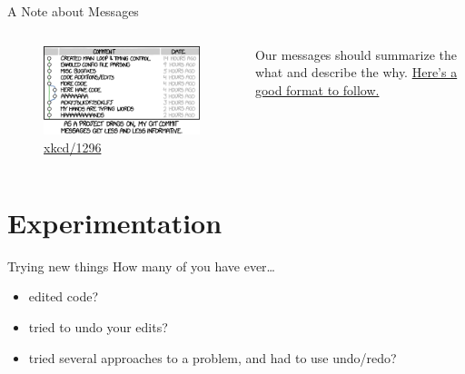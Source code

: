 \documentclass{beamer}
\theoremstyle{example}
\newcommand{\xkcd}[1]{\href{https://xkcd.com/#1}{xkcd/#1}}
\begin{document}
\begin{frame}{A Note about Messages}
    \begin{columns}
        \begin{figure}
            \includegraphics[scale=0.4]{img/git_commit}
            \caption{\xkcd{1296}}
        \end{figure}

        Our messages should summarize the what and describe the why.
        \href{https://tbaggery.com/2008/04/19/a-note-about-git-commit-messages.html}
        {Here's a good format to follow.}
    \end{columns}
\end{frame}

\section{Experimentation}
\begin{frame}{Trying new things}
    How many of you have ever\dots
    \begin{itemize}[<+->]
        \item edited code?
        \item tried to undo your edits?
        \item tried several approaches to a problem, and had to use undo/redo?
    \end{itemize}
\end{frame}
\end{document}
